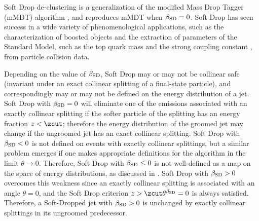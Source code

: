 \documentclass[letterpaper,11pt]{article}
\begin{document}
Soft Drop de-clustering is a generalization of the modified Mass Drop Tagger (mMDT) algorithm \cite{Dasgupta:2013ihk}, and reproduces mMDT when \(\beta_{\rm SD} = 0\).
%
Soft Drop has seen success in a wide variety of phenomenological applications, such as the characterization of boosted objects \cite{Thaler:2008ju,Thaler:2011gf,Hook:2011cq,Gallicchio:2011xq,Soper:2012pb,Gallicchio:2012ez,CMS-PAS-JME-09-001,CMS-PAS-EXO-09-002,CMS:2013kfa,ATL-PHYS-PUB-2009-081,ATL-PHYS-PUB-2010-008,ATLAS:2019kwg,Cui:2010km,ATLAS-CONF-2011-053,Chatrchyan:2013rla,Larkoski:2013eya,Dasgupta:2012hg,Backovic:2013bga,ATLAS-CONF-2013-084,Komiske:2018vkc,Komiske:2016rsd,Metodiev:2018ftz,Krohn:2012fg,MERINO:2013tta,Bhattacherjee:2016bpy,Macaluso:2018tck,Egan:2017ojy,Kasieczka:2017nvn,Pearkes:2017hku,Butter:2017cot,Catani:1992ua,Dokshitzer:1998kz,Dasgupta:2001sh,Banfi:2004yd,Banfi:2005gj,Ellis:2009su,Banfi:2010pa,Walsh:2011fz,Chien:2012ur,Li:2012bw,Jouttenus:2013hs,Hatta:2013iba,Larkoski:2014tva,Procura:2018zpn,Aaboud:2017aca,Frye:2016aiz, Almeida:2008yp,Larkoski:2017iuy,Larkoski:2017cqq,Thaler:2010tr,Ellis:2009me,Abdesselam:2010pt,Katz:2010mr,Gallicchio:2010dq,Adams:2015hiv,Sirunyan:2017ezt,Moore:2018lsr,FerreiradeLima:2016gcz,Rubin:2010fc,Chatrchyan:2012sn,CMS-PAS-BTV-13-001,CMS-PAS-JME-13-006,Kribs:2009yh,Chen:2010wk,Hackstein:2010wk,Kim:2010uj,Almeida:2011aa,Pandolfi:2012ima,Vernieri:2014wfa,CMS-PAS-HIG-17-007,Procura:2014cba} and the extraction of parameters of the Standard Model, such as the top quark mass \cite{Hoang:2017kmk,ATLAS:2021urs,Negrini:2022gec} and the strong coupling constant \cite{Marzani:2019evv}, from particle collision data.

Depending on the value of \(\beta_{\rm SD}\), Soft Drop may or may not be collinear safe (invariant under an exact collinear splitting of a final-state particle), and correspondingly may or may not be defined on the energy distribution of a jet.
%
Soft Drop with \(\beta_{\rm SD} = 0\) will eliminate one of the emissions associated with an exactly collinear splitting if the softer particle of the splitting has an energy fraction \(z < \zcut\);
%
therefore the energy distribution of the groomed jet may change if the ungroomed jet has an exact collinear splitting.
%
Soft Drop with \(\beta_{\rm SD} < 0\) is not defined on events with exactly collinear splittings, but a similar problem emerges if one makes appropriate definitions for the algorithm in the limit \(\theta \to 0\).
%
Therefore, Soft Drop with \(\beta_{\rm SD} \leq 0\) is not well-defined as a map on the space of energy distributions, as discussed in .
%
Soft Drop with \(\beta_{\rm SD} > 0\) overcomes this weakness since an exactly collinear splitting is associated with an angle \(\theta = 0\), and the Soft Drop criterion \(z > \zcut \theta^{\beta_{\rm SD}} = 0\) is always satisfied.
%
Therefore, a Soft-Dropped jet with \(\beta_{\rm SD} > 0\) is unchanged by exactly collinear splittings in its ungroomed predecessor.
\end{document}

